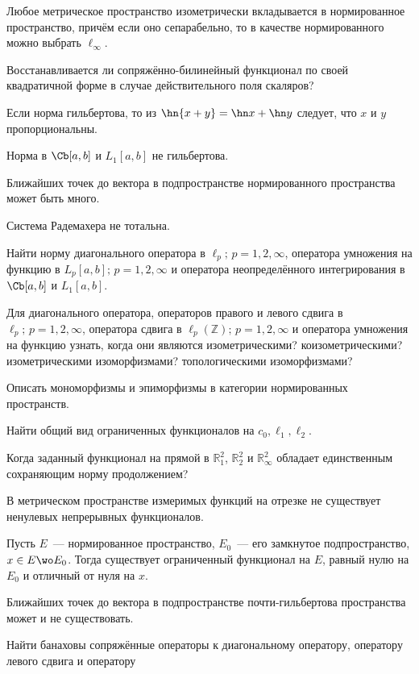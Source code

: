 \documentclass[a4paper]{article}
\begin{document}
\begin{nums}{-1}
\item Любое метрическое пространство изометрически вкладывается в нормированное пространство,
причём если оно сепарабельно, то в качестве нормированного можно выбрать $\ell_\infty$.
\item Восстанавливается ли сопряжённо-билинейный функционал по своей квадратичной форме
в случае действительного поля скаляров?
\item Если норма гильбертова, то из $\hn{x+y} = \hn x + \hn y$ следует, что $x$ и $y$
пропорциональны.
\item Норма в $\Cb[a,b]$ и $L_1[a,b]$ не гильбертова.
\item Ближайших точек до вектора в подпространстве нормированного пространства может быть много.
\item Система Радемахера не тотальна.
\item Найти норму диагонального оператора в $\ell_p;\,p = 1,2,\infty$, оператора умножения
на функцию в $L_p[a,b];\,p = 1,2,\infty$ и оператора неопределённого интегрирования в
$\Cb[a,b]$ и $L_1[a,b]$.
\item Для диагонального оператора, операторов правого и левого сдвига в $\ell_p;\,p=1,2,\infty$,
оператора сдвига в $\ell_p(\mathbb{Z});\,p=1,2,\infty$ и оператора умножения на функцию узнать,
когда они являются изометрическими? коизометрическими? изометрическими изоморфизмами?
топологическими изоморфизмами?
\item Описать мономорфизмы и эпиморфизмы в категории нормированных пространств.
\item Найти общий вид ограниченных функционалов на $c_0,\ell_1,\ell_2$.
\item Когда заданный функционал на прямой в $\mathbb{R}^2_1$, $\mathbb{R}^2_2$ и $\mathbb{R}^2_\infty$
обладает единственным сохраняющим норму продолжением?
\item В метрическом пространстве измеримых функций на отрезке не существует ненулевых непрерывных
функционалов.
\item Пусть $E$~--- нормированное пространство, $E_0$~--- его замкнутое подпространство,
$x \in E \wo E_0$. Тогда существует ограниченный функционал на $E$, равный нулю на $E_0$ и
отличный от нуля на $x$.
\item Ближайших точек до вектора в подпространстве почти-гильбертова пространства может и не существовать.
\item Найти банаховы сопряжённые операторы к диагональному оператору, оператору левого сдвига и оператору

\end{nums}
\end{document}
